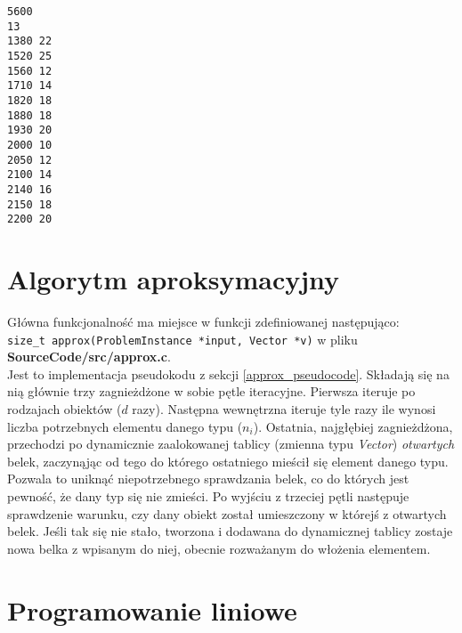 \begin{lstlisting} 
5600
13
1380 22
1520 25
1560 12
1710 14
1820 18
1880 18
1930 20
2000 10
2050 12
2100 14
2140 16
2150 18
2200 20 
\end{lstlisting}

\section{Algorytm aproksymacyjny}
Główna funkcjonalność ma miejsce w funkcji zdefiniowanej następująco: \\ \verb|size_t approx(ProblemInstance *input, Vector *v)| w pliku \textbf{SourceCode/src/approx.c}. \\
Jest to implementacja pseudokodu z sekcji \ref{approx_pseudocode}.
Składają się na nią głównie trzy zagnieżdżone w sobie pętle iteracyjne.
Pierwsza iteruje po rodzajach obiektów ($d$ razy).
Następna wewnętrzna iteruje tyle razy ile wynosi liczba potrzebnych elementu danego typu ($n_i$).
Ostatnia, najgłębiej zagnieżdżona, przechodzi po dynamicznie zaalokowanej tablicy (zmienna typu \textit{Vector}) \textit{otwartych} belek, zaczynąjąc od tego do którego ostatniego mieścił się element danego typu. Pozwala to uniknąć niepotrzebnego sprawdzania belek, co do których jest pewność, że dany typ się nie zmieści. 
Po wyjściu z trzeciej pętli następuje sprawdzenie warunku, czy dany obiekt został umieszczony w którejś z otwartych belek. Jeśli tak się nie stało, tworzona i dodawana do dynamicznej tablicy zostaje nowa belka z wpisanym do niej, obecnie rozważanym do włożenia elementem.

\section{Programowanie liniowe}
